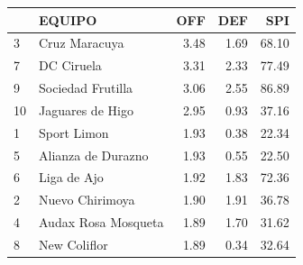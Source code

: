 \documentclass[]{article}
\newenvironment{Shaded}{\begin{snugshade}}{\end{snugshade}}
\newcommand{\CommentTok}[1]{\textcolor[rgb]{0.56,0.35,0.01}{\textit{#1}}}
\newcommand{\DataTypeTok}[1]{\textcolor[rgb]{0.13,0.29,0.53}{#1}}
\newcommand{\KeywordTok}[1]{\textcolor[rgb]{0.13,0.29,0.53}{\textbf{#1}}}
\newcommand{\NormalTok}[1]{#1}
\newcommand{\OperatorTok}[1]{\textcolor[rgb]{0.81,0.36,0.00}{\textbf{#1}}}
\newcommand{\OtherTok}[1]{\textcolor[rgb]{0.56,0.35,0.01}{#1}}
\newcommand{\StringTok}[1]{\textcolor[rgb]{0.31,0.60,0.02}{#1}}
\begin{document}
\begin{Shaded}
\end{Shaded}

\begin{table}[H]
\centering
\begin{tabular}{l|l|r|r|r}
\hline
  & EQUIPO & OFF & DEF & SPI\\
\hline
\rowcolor{gray!6}  3 & Cruz Maracuya & 3.48 & 1.69 & 68.10\\
\hline
7 & DC Ciruela & 3.31 & 2.33 & 77.49\\
\hline
\rowcolor{gray!6}  9 & Sociedad Frutilla & 3.06 & 2.55 & 86.89\\
\hline
10 & Jaguares de Higo & 2.95 & 0.93 & 37.16\\
\hline
\rowcolor{gray!6}  1 & Sport Limon & 1.93 & 0.38 & 22.34\\
\hline
5 & Alianza de Durazno & 1.93 & 0.55 & 22.50\\
\hline
\rowcolor{gray!6}  6 & Liga de Ajo & 1.92 & 1.83 & 72.36\\
\hline
2 & Nuevo Chirimoya & 1.90 & 1.91 & 36.78\\
\hline
\rowcolor{gray!6}  4 & Audax Rosa Mosqueta & 1.89 & 1.70 & 31.62\\
\hline
8 & New Coliflor & 1.89 & 0.34 & 32.64\\
\hline
\end{tabular}
\end{table}

\begin{Shaded}
\end{Shaded}
\end{document}
